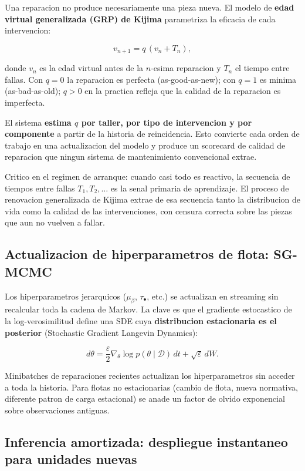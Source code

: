 \documentclass[11pt,a4paper]{article}
\begin{document}
Una reparacion no produce necesariamente una pieza nueva. El modelo de
\textbf{edad virtual generalizada (GRP) de Kijima} parametriza la eficacia
de cada intervencion:

$$v_{n+1} = q\,(v_n + T_n),$$

donde $v_n$ es la edad virtual antes de la $n$-esima reparacion y $T_n$
el tiempo entre fallas. Con $q = 0$ la reparacion es perfecta
(as-good-as-new); con $q = 1$ es minima (as-bad-as-old); $q > 0$ en la
practica refleja que la calidad de la reparacion es imperfecta.

El sistema \textbf{estima $q$ por taller, por tipo de intervencion y
por componente} a partir de la historia de reincidencia. Esto convierte
cada orden de trabajo en una actualizacion del modelo y produce un
scorecard de calidad de reparacion que ningun sistema de mantenimiento
convencional extrae.

Critico en el regimen de arranque: cuando casi todo es reactivo, la
secuencia de tiempos entre fallas $T_1, T_2, \dots$ es la senal primaria
de aprendizaje. El proceso de renovacion generalizada de Kijima extrae
de esa secuencia tanto la distribucion de vida como la calidad de las
intervenciones, con censura correcta sobre las piezas que aun no vuelven
a fallar.

\subsection{Actualizacion de hiperparametros de flota: SG-MCMC}

Los hiperparametros jerarquicos ($\mu_\beta$, $\tau_\bullet$, etc.) se
actualizan en streaming sin recalcular toda la cadena de Markov. La clave
es que el gradiente estocastico de la log-verosimilitud define una SDE
cuya \textbf{distribucion estacionaria es el posterior}
(Stochastic Gradient Langevin Dynamics):

$$d\theta = \frac{\varepsilon}{2}
  \nabla_\theta \log p(\theta \mid \mathcal{D})\,dt + \sqrt{\varepsilon}\,dW.$$

Minibatches de reparaciones recientes actualizan los hiperparametros sin
acceder a toda la historia. Para flotas no estacionarias (cambio de
flota, nueva normativa, diferente patron de carga estacional) se anade
un factor de olvido exponencial sobre observaciones antiguas.

\subsection{Inferencia amortizada: despliegue instantaneo para unidades nuevas}
\end{document}
